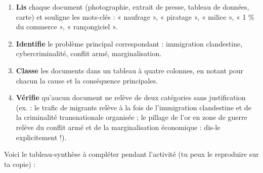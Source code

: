 \documentclass[11pt]{article}
\begin{document}
\begin{methode}
\begin{enumerate}
\item \textbf{Lis} chaque document (photographie, extrait de presse, tableau de données, carte) et souligne les mots-clés : « naufrage », « piratage », « milice », « 1 \% du commerce », « rançongiciel ».
\item \textbf{Identifie} le problème principal correspondant : immigration clandestine, cybercriminalité, conflit armé, marginalisation.
\item \textbf{Classe} les documents dans un tableau à quatre colonnes, en notant pour chacun la cause et la conséquence principales.
\item \textbf{Vérifie} qu'aucun document ne relève de deux catégories sans justification (ex. : le trafic de migrants relève à la fois de l'immigration clandestine et de la criminalité transnationale organisée ; le pillage de l'or en zone de guerre relève du conflit armé et de la marginalisation économique : dis-le explicitement !).
\end{enumerate}
\end{methode}

Voici le tableau-synthèse à compléter pendant l'activité (tu peux le reproduire sur ta copie) :
\end{document}
